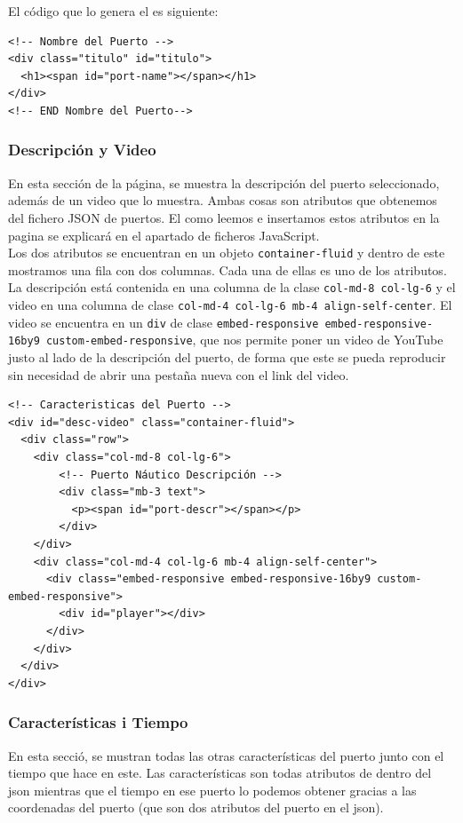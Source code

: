 \documentclass{article}
\begin{document}
\noindent El código que lo genera el es siguiente:

\begin{verbatim}
<!-- Nombre del Puerto -->
<div class="titulo" id="titulo">
  <h1><span id="port-name"></span></h1>
</div>
<!-- END Nombre del Puerto-->    
\end{verbatim}

\subsubsection{Descripción y Video}
En esta sección de la página, se muestra la descripción del puerto seleccionado, además de un video que lo muestra. Ambas cosas son atributos que obtenemos del fichero JSON de puertos. El como leemos e insertamos estos atributos en la pagina se explicará en el apartado de ficheros JavaScript.\\

\noindent Los dos atributos se encuentran en un objeto \texttt{container-fluid} y dentro de este mostramos una fila con dos columnas. Cada una de ellas es uno de los atributos. La descripción está contenida en una columna de la clase \texttt{col-md-8 col-lg-6} y el video en una columna de clase \texttt{col-md-4 col-lg-6 mb-4 align-self-center}. El video se encuentra en un \texttt{div} de clase \texttt{embed-responsive embed-responsive-16by9 custom-embed-responsive}, que nos permite poner un video de YouTube justo al lado de la descripción del puerto, de forma que este se pueda reproducir sin necesidad de abrir una pestaña nueva con el link del video.

\begin{verbatim}
<!-- Caracteristicas del Puerto -->
<div id="desc-video" class="container-fluid">
  <div class="row">
    <div class="col-md-8 col-lg-6">
        <!-- Puerto Náutico Descripción -->
        <div class="mb-3 text">
          <p><span id="port-descr"></span></p>
        </div>
    </div>
    <div class="col-md-4 col-lg-6 mb-4 align-self-center">
      <div class="embed-responsive embed-responsive-16by9 custom-embed-responsive">
        <div id="player"></div>
      </div>
    </div>
  </div>
</div>
\end{verbatim}

\subsubsection{Características i Tiempo}
En esta secció, se mustran todas las otras características del puerto junto con el tiempo que hace en este. Las características son todas atributos de dentro del json mientras que el tiempo en ese puerto lo podemos obtener gracias a las coordenadas del puerto (que son dos atributos del puerto en el json).\\ 
\end{document}
